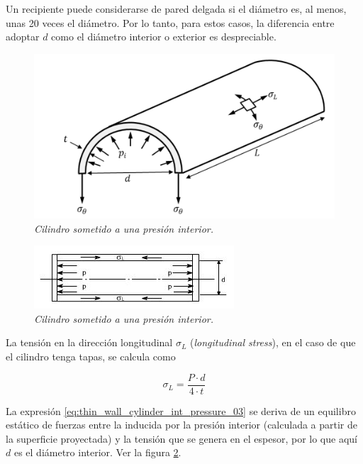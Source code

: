 Un recipiente puede considerarse de pared delgada si el diámetro es, al menos, unas 20 veces el diámetro. Por lo tanto, para estos casos, la diferencia entre adoptar $d$ como el diámetro interior o exterior es despreciable.

\begin{figure}[ht]
     \centerline{\includegraphics[scale=0.6]{thin_wall_cylinder_int_pressure_01.png}}
     \caption{\textit{Cilindro sometido a una presión interior.}}
     \label{im:thin_wall_cylinder_int_pressure_01}
\end{figure}

\begin{figure}[ht]
     \centerline{\includegraphics[scale=0.8]{thin_wall_cylinder_int_pressure_02.jpeg}}
     \caption{\textit{Cilindro sometido a una presión interior.}}
     \label{im:thin_wall_cylinder_int_pressure_02}
\end{figure}

La tensión en la dirección longitudinal $\sigma_L$ (\textit{longitudinal stress}), en el caso de que el cilindro tenga tapas, se calcula como

\begin{equation}
     \sigma_L=\frac{P \cdot d}{\num{4} \cdot t}
     \label{eq:thin_wall_cylinder_int_pressure_03}
\end{equation}

La expresión \ref{eq:thin_wall_cylinder_int_pressure_03} se deriva de un equilibro estático de fuerzas entre la inducida por la presión interior (calculada a partir de la superficie proyectada) y la tensión que se genera en el espesor, por lo que aquí $d$ es el diámetro interior. Ver la figura \ref{im:thin_wall_cylinder_int_pressure_02}.

